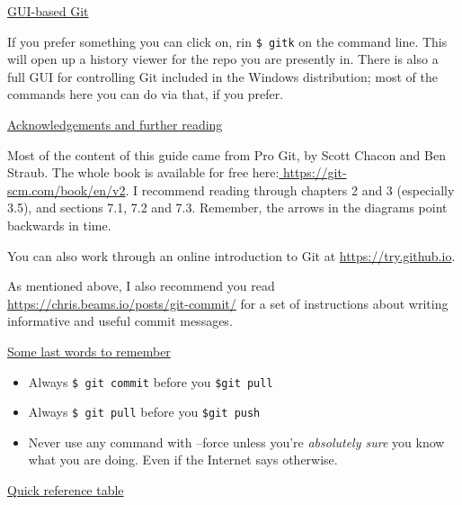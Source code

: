 \documentclass[11pt, a4paper, english]{article}
\begin{document}
\underline{GUI-based Git}

If you prefer something you can click on, rin \verb|$ gitk| on the command line. This will open up a history viewer for the repo you are presently in. There is also a full GUI for controlling Git included in the Windows distribution; most of the commands here you can do via that, if you prefer.

\underline{Acknowledgements and further reading}

Most of the content of this guide came from Pro Git, by Scott Chacon and Ben Straub. The whole book is available for free here:\url{ https://git-scm.com/book/en/v2}. I recommend reading through chapters 2 and 3 (especially 3.5), and sections 7.1, 7.2 and 7.3. Remember, the arrows in the diagrams point backwards in time.

You can also work through an online introduction to Git at \url{https://try.github.io}.

As mentioned above, I also recommend you read \url{https://chris.beams.io/posts/git-commit/} for a set of instructions about writing informative and useful commit messages.

\underline{Some last words to remember}

\begin{itemize}
\item Always \verb|$ git commit| before you \verb|$git pull|
\item Always \verb|$ git pull| before you \verb|$git push|
\item Never use any command with --force unless you're \textit{absolutely sure} you know what you are doing. Even if the Internet says otherwise.
\end{itemize}

\underline{Quick reference table}
\end{document}
